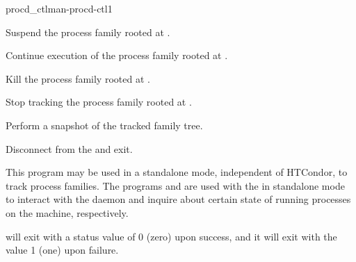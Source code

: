 \begin{ManPage}{procd\_ctl}{man-procd-ctl}{}{1}
\begin{Options}
  {Suspend the process family rooted at .}

  {Continue execution of the process family rooted at .}

  {Kill the process family rooted at .}

  {Stop tracking the process family rooted at .}

  {Perform a snapshot of the tracked family tree.}

  {Disconnect from the  and exit.}

\end{Options}
	

\GenRem

This program may be used in a standalone mode, independent of
HTCondor, to track process families. The programs  and
 are used with the  in standalone mode
to interact with the daemon and inquire about certain state of running
processes on the machine, respectively.

\ExitStatus

 will exit with a status value of 0 (zero) upon success,
and it will exit with the value 1 (one) upon failure.

\end{ManPage}
